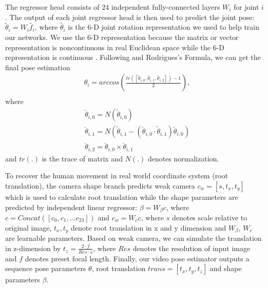 \documentclass{svproc}
\begin{document}
The regressor head consists of 24 independent fully-connected layers $W_i$ for joint $i$. The output of each joint regressor head is then used to predict the joint pose: $\tilde{\theta}_i=W_i \tilde{f_i}$, where $\tilde{\theta_i}$ is the 6-D joint rotation representation we used to help train our networks. We use the 6-D representation because the matrix or vector representation is  noncontinuous in real Euclidean space while the 6-D representation is continuous \cite{zhou2019continuity}. Following \cite{zhou2019continuity} and Rodrigues's Formula, we can get the final pose estimation
\begin{equation}
\label{eq: diffusion process}
\begin{split}
& \theta_i=arccos(\frac{tr([\breve{\theta}_{i,0}, \breve{\theta}_{i,1}, \breve{\theta}_{i,2}]) - 1}{2}) , \\
\end{split}
\end{equation}
where
\begin{equation}
\label{6d 2 3x3}
\begin{split}
& \breve{\theta}_{i,0} = N(\tilde{\theta}_{i,0}) \\
& \breve{\theta}_{i,1} = N(\tilde{\theta}_{i,1}-(\breve{\theta}_{i,0} \cdot \tilde{\theta}_{i,1}) \breve{\theta}_{i,0}) \\
& \breve{\theta}_{i,2} = \breve{\theta}_{i,0} \times \breve{\theta}_{i,1}
\end{split}
\end{equation}
and $tr(.)$ is the trace of matrix and $N(.)$ denotes normalization.



To recover the human movement in real world coordinate system (root translation), the camera shape branch predicts weak camera $c_w=[s,t_x,t_y]$ which is used to calculate root translation while the shape parameters are predicted by independent linear regressor: $\beta=W_\beta c$, where $c=Concat([c_0,c_1,...c_{23}])$ and $c_w =W_c c$, where  $s$ denotes scale relative to original image, $t_x, t_y$ denote root translation in x and y dimension and $W_\beta$, $W_c$ are learnable parameters. Based on weak camera, we can simulate the translation in z-dimension by $t_z=\frac{2 \cdot f}{Res \cdot s}$, where $Res$ denotes the resolution of input image and $f$ denotes preset focal length. Finally, our video pose estimator outputs a sequence pose parameters $\theta$, root translation $trans=[t_x,t_y,t_z]$ and shape parameters $\beta$.
\end{document}
